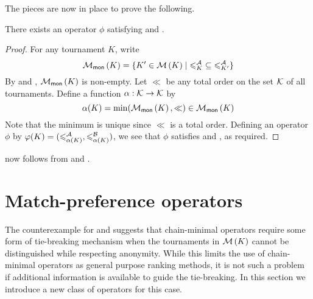 The pieces are now in place to prove the following.

\begin{proposition}
    \label{tourn_result_chainmin_mon_compatibility}
    There exists an operator $\phi$ satisfying  and
    .
\end{proposition}

\begin{proof}
    For any tournament $K$, write
    \[
        \operatorname{\mathcal{M}}_{\mathsf{mon}}\left({K}\right) = \{
            K' \in \operatorname{\mathcal{M}}\left({K}\right) \mid {\leqslant^{\mathcal{A}}_K} \subseteq {\leqslant^{\mathcal{A}}_{K'}}
        \}
    \]
    By  and
    , $\operatorname{\mathcal{M}}_{\mathsf{mon}}\left({K}\right)$ is non-empty. Let
    $\ll$ be any total order on the set $\mathcal{K}$ of all tournaments.
    Define a function $\alpha: \mathcal{K} \to \mathcal{K}$ by
    \[
        \alpha(K) = \min(\operatorname{\mathcal{M}}_{\mathsf{mon}}\left({K}\right), {\ll}) \in \operatorname{\mathcal{M}}_{\mathsf{mon}}\left({K}\right)
    \]
    Note that the minimum is unique since ${\ll}$ is a total order. Defining an
    operator $\phi$ by $\varphi(K) = ({\leqslant^{\mathcal{A}}_{\alpha(K)}}, {\leqslant^{\mathcal{B}}_{\alpha(K)}})$,
    we see that $\phi$ satisfies  and , as
    required.
\end{proof}

 now follows from
 and
.

\section{Match-preference operators}
\label{tourn_sec_match_preference_operators}


The counterexample for  and  suggests that
chain-minimal operators require some form of tie-breaking mechanism when the
tournaments in $\operatorname{\mathcal{M}}\left({K}\right)$ cannot be distinguished while respecting anonymity.
While this limits the use of chain-minimal operators as general purpose ranking
methods, it is not such a problem if additional information is available to
guide the tie-breaking. In this section we introduce a new class of operators
for this case.

